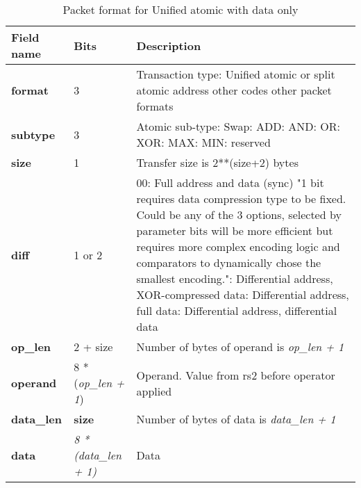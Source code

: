 \begin{table}[htp]
  \centering
  \caption{Packet format for Unified atomic with data only}
  \label{tab:te_datadx0y7}
  \begin{tabulary}{\textwidth}{|l|p{40mm}|p{90mm}|}
    \hline
    {\bf Field name} & {\bf Bits} & {\bf Description} \\
    \hline
    \textbf{format} & 	3	& Transaction type: Unified atomic or split atomic address\newline	
		other codes other packet formats\\
    \hline
    \textbf{subtype} & 	3	& Atomic sub-type: Swap: ADD: AND: OR: XOR: MAX: MIN: reserved\\	
    \hline
    \textbf{size} & 1 & Transfer size is 2**(size+2) bytes\\
    \hline
    \textbf{diff} & 1 or 2 & 00: Full address and data (sync)	"1 bit requires data compression type to be fixed.  Could be any of the 3 options, selected by parameter bits will be more efficient but requires more complex encoding logic and comparators to dynamically chose the smallest encoding.":  Differential address, XOR-compressed data: Differential address, full data: Differential address, differential data\\
    \hline
    \textbf{op\_len} & 2 + size & Number of bytes of operand is \textit{op\_len + 1}\\
    \hline
    \textbf{operand}	& 8 * (\textit{op\_len + 1}) & Operand.  Value from rs2 before operator applied\\
    \hline
    \textbf{data\_len}	& \textbf{size} & Number of bytes of data is \textit {data\_len + 1}\\
    \hline
    \textbf{data} & \textit {8 * (data\_len + 1)} & 
                Data\\
    \hline
  \end{tabulary}
\end{table}


